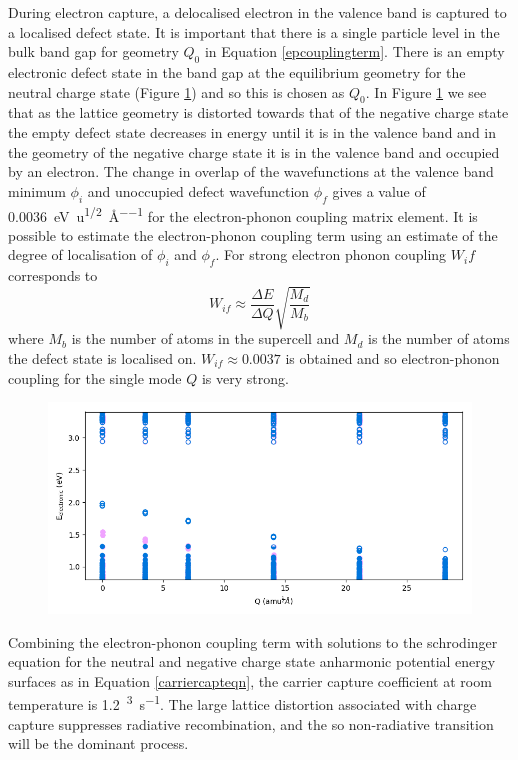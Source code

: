 {During electron capture, a delocalised electron in the valence band is captured to a localised defect state. It is important that there is a single particle level in the bulk band gap for geometry $Q_0$ in Equation \ref{epcouplingterm}. There is an empty electronic defect state in the band gap at the equilibrium geometry for the neutral charge state (Figure \ref{eigenvalues}) and so this is chosen as $Q_0$.
\autocite{Alkauskas 2014}
In Figure \ref{eigenvalues} we see that as the lattice geometry is distorted towards that of the negative charge state the empty defect state decreases in energy until it is in the valence band and in the geometry of the negative charge state it is in the valence band and occupied by an electron. 
The change in overlap of the wavefunctions at the valence band minimum $\phi_i$ and unoccupied defect wavefunction $\phi_f$ gives a value of \SI{0.0036}{\electronvolt\per\amu\tothe{1/2}\per\angstrom} for the electron-phonon coupling matrix element.
It is possible to estimate the electron-phonon coupling term using an estimate of the degree of localisation of $\phi_i$ and $\phi_f$. For strong electron phonon coupling $W_if$ corresponds to 
\begin{equation}
W_{if} \approx \frac{\Delta E}{\Delta Q}\sqrt{\frac{M_d}{M_b}}
\end{equation}
where $M_b$ is the number of atoms in the supercell and $M_d$ is the number of atoms the defect state is localised on. $W_{if}\approx0.0037$ is obtained and so electron-phonon coupling for the single mode $Q$ is very strong.

\begin{figure}[h!]   
\centering
  \includegraphics[width=1.0\columnwidth]{figures/ch6/eigs.png}
  \caption[ ]{}
\label{eigenvalues}
\end{figure}

Combining the electron-phonon coupling term with solutions to the schrodinger equation for the neutral and negative charge state anharmonic potential energy surfaces as in Equation \ref{carriercapteqn}, the carrier capture coefficient at room temperature is \SI{1.2}{\centimetre\cubed\per\second}.
The large lattice distortion associated with charge capture suppresses radiative recombination, and the so non-radiative transition will be the dominant process.
\autocite{theory of defects in solids}


}
